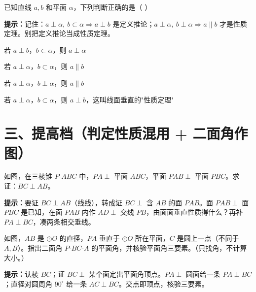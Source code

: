 \documentclass{exam-zh}
\begin{document}
\begin{question}[points=5]
  已知直线 $a,b$ 和平面 $\alpha$，下列判断正确的是（    ）
  \begin{hintbox}
\textbf{提示：}记住：$a\perp\alpha,\ b\subset\alpha\Rightarrow a\perp b$ 是定义推论；$a\perp\alpha,\ b\perp\alpha\Rightarrow a\parallel b$ 才是性质定理。别把定义推论当成性质定理。\end{hintbox}

  \begin{choices}
    \item 若 $a\perp b$，$b\subset\alpha$，则 $a\perp\alpha$
    \item 若 $a\perp\alpha$，$b\subset\alpha$，则 $a\parallel b$
    \item 若 $a\perp\alpha$，$b\perp\alpha$，则 $a\parallel b$
    \item 若 $a\perp\alpha$，$b\subset\alpha$，则 $a\perp b$，这叫线面垂直的"性质定理"
  \end{choices}
\end{question}


\section*{三、提高档（判定性质混用 + 二面角作图）}


\begin{problem}[points=9]
    如图，在三棱锥 $P\text{-}ABC$ 中，$PA\perp$ 平面 $ABC$，平面 $PAB\perp$ 平面 $PBC$。求证：$BC\perp AB$。

    \begin{hintbox}
\textbf{提示：}要证 $BC\perp AB$（线线），转成证 $BC\perp$ 含 $AB$ 的面 $PAB$。面 $PAB\perp$ 面 $PBC$ 是已知，在面 $PAB$ 内作 $AD\perp$ 交线 $PB$，由面面垂直性质得什么？再补 $PA\perp BC$，凑两条相交垂线。\end{hintbox}

  \answerarea[56mm]
\end{problem}



\begin{problem}[points=9]
    如图，$AB$ 是 $\odot O$ 的直径，$PA$ 垂直于 $\odot O$ 所在平面，$C$ 是圆上一点（不同于 $A,B$）。指出二面角 $P\text{-}BC\text{-}A$ 的平面角，并核验平面角三要素。（只找角，不计算大小。）

    \begin{hintbox}
\textbf{提示：}认棱 $BC$；证 $BC\perp$ 某个面定出平面角顶点。$PA\perp$ 圆面给一条 $PA\perp BC$；直径对圆周角 $90^{\circ}$ 给一条 $AC\perp BC$。交点即顶点，核验三要素。\end{hintbox}

  \answerarea[52mm]
\end{problem}
\end{document}
